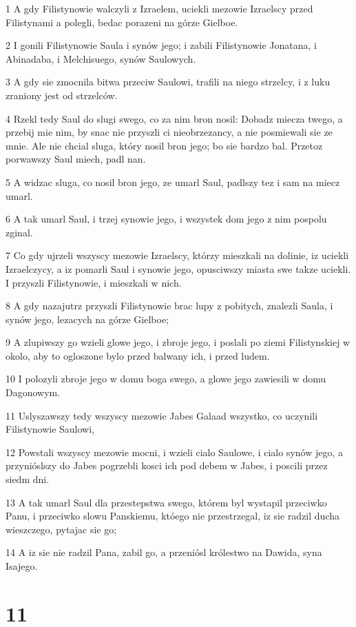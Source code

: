\par 1 A gdy Filistynowie walczyli z Izraelem, uciekli mezowie Izraelscy przed Filistynami a polegli, bedac porazeni na górze Gielboe.
\par 2 I gonili Filistynowie Saula i synów jego; i zabili Filistynowie Jonatana, i Abinadaba, i Melchisuego, synów Saulowych.
\par 3 A gdy sie zmocnila bitwa przeciw Saulowi, trafili na niego strzelcy, i z luku zraniony jest od strzelców.
\par 4 Rzekl tedy Saul do slugi swego, co za nim bron nosil: Dobadz miecza twego, a przebij mie nim, by snac nie przyszli ci nieobrzezancy, a nie posmiewali sie ze mnie. Ale nie chcial sluga, który nosil bron jego; bo sie bardzo bal. Przetoz porwawszy Saul miech, padl nan.
\par 5 A widzac sluga, co nosil bron jego, ze umarl Saul, padlszy tez i sam na miecz umarl.
\par 6 A tak umarl Saul, i trzej synowie jego, i wszystek dom jego z nim pospolu zginal.
\par 7 Co gdy ujrzeli wszyscy mezowie Izraelscy, którzy mieszkali na dolinie, iz uciekli Izraelczycy, a iz pomarli Saul i synowie jego, opusciwszy miasta swe takze uciekli. I przyszli Filistynowie, i mieszkali w nich.
\par 8 A gdy nazajutrz przyszli Filistynowie brac lupy z pobitych, znalezli Saula, i synów jego, lezacych na górze Gielboe;
\par 9 A zlupiwszy go wzieli glowe jego, i zbroje jego, i poslali po ziemi Filistynskiej w okolo, aby to ogloszone bylo przed balwany ich, i przed ludem.
\par 10 I polozyli zbroje jego w domu boga swego, a glowe jego zawiesili w domu Dagonowym.
\par 11 Uslyszawszy tedy wszyscy mezowie Jabes Galaad wszystko, co uczynili Filistynowie Saulowi,
\par 12 Powstali wszyscy mezowie mocni, i wzieli cialo Saulowe, i cialo synów jego, a przynióslszy do Jabes pogrzebli kosci ich pod debem w Jabes, i poscili przez siedm dni.
\par 13 A tak umarl Saul dla przestepstwa swego, którem byl wystapil przeciwko Panu, i przeciwko slowu Panskiemu, któego nie przestrzegal, iz sie radzil ducha wieszczego, pytajac sie go;
\par 14 A iz sie nie radzil Pana, zabil go, a przeniósl królestwo na Dawida, syna Isajego.

\chapter{11}

